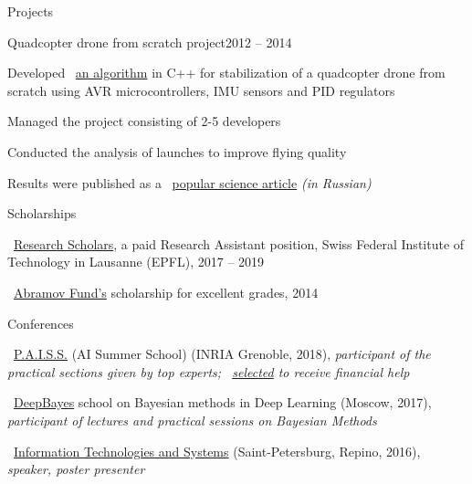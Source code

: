 \documentclass{resume} %
\begin{document}
\begin{rSection}{Projects}
	\begin{rSubsection}{Quadcopter drone from scratch project}{2012 -- 2014}{}{}
		\item Developed \faExternalLink~\href{https://github.com/it-workshop/Quadrocopter}{an algorithm} in C++ for stabilization of a quadcopter drone from scratch using AVR microcontrollers, IMU sensors and PID regulators
		\item Managed the project consisting of 2-5 developers
		\item Conducted the analysis of launches to improve flying quality
		\item Results were published as a \faExternalLink~\href{http://web.archive.org/web/20141016114551/http://habrahabr.ru/company/technoworks/blog/216437/}{popular science article} {\em (in Russian)}
	\end{rSubsection}
\end{rSection}

\begin{rSection}{Scholarships}
	\vspace{-1em}
	\item \faExternalLink~\href{https://ic.epfl.ch/ResearchScholars}{Research Scholars}, a paid Research Assistant position, Swiss Federal Institute of Technology in Lausanne (EPFL), 2017 -- 2019
	\item \faExternalLink~\href{http://phystech-foundation.org/}{Abramov Fund's} scholarship for excellent grades, 2014
\end{rSection}

\begin{rSection}{Conferences}
\vspace{-1em}
\item \faExternalLink~\href{https://project.inria.fr/paiss/}{P.A.I.S.S.} (AI Summer School) (INRIA Grenoble, 2018){, \em participant of the practical sections given by top experts; \faExternalLink~\href{http://www.europe.naverlabs.com/Blog/Students-at-PAISS}{selected} to receive financial help }
\item \faExternalLink~\href{http://deepbayes.ru}{DeepBayes} school on Bayesian methods in Deep Learning (Moscow, 2017){, \em participant of lectures and practical sessions on Bayesian Methods}
\item \faExternalLink~\href{http://iitp.ru/en/conferences/itas}{Information Technologies and Systems} (Saint-Petersburg, Repino, 2016){, \em speaker, poster presenter}
\end{rSection}
\end{document}

